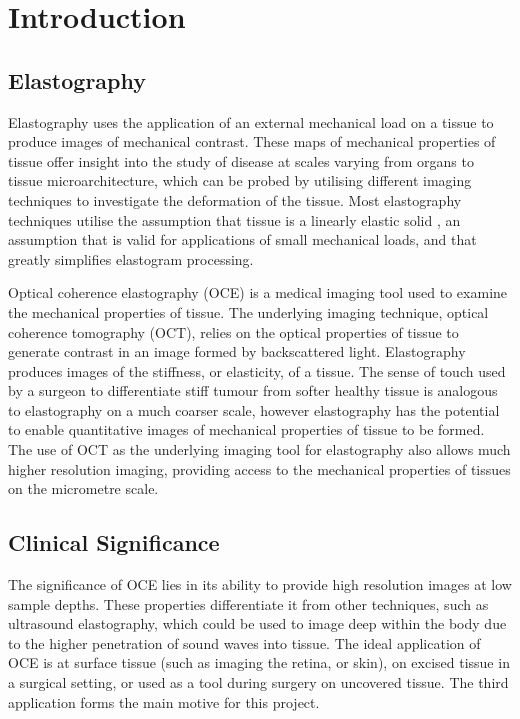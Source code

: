 \chapter{Introduction}

\section{Elastography}
Elastography uses the application of an external mechanical load on a tissue to produce images of mechanical contrast. These maps of mechanical properties of tissue offer insight into the study of disease at scales varying from organs to tissue microarchitecture, which can be probed by utilising different imaging techniques to investigate the deformation of the tissue. Most elastography techniques utilise the assumption that tissue is a linearly elastic solid \cite{kennedy_review_2014}, an assumption that is valid for applications of small mechanical loads, and that greatly simplifies elastogram processing. 

Optical coherence elastography (OCE) is a medical imaging tool used to examine the mechanical properties of tissue. The underlying imaging technique, optical coherence tomography (OCT), relies on the optical properties of tissue to generate contrast in an image formed by backscattered light. Elastography produces images of the stiffness, or elasticity, of a tissue. The sense of touch used by a surgeon to differentiate stiff tumour from softer healthy tissue is analogous to elastography on a much coarser scale, however elastography has the potential to enable quantitative images of mechanical properties of tissue to be formed. The use of OCT as the underlying imaging tool for elastography also allows much higher resolution imaging, providing access to the mechanical properties of tissues on the micrometre scale. 

\section{Clinical Significance}
The significance of OCE lies in its ability to provide high resolution images at low sample depths. These properties differentiate it from other techniques, such as ultrasound elastography, which could be used to image deep within the body due to the higher penetration of sound waves into tissue. The ideal application of OCE is at surface tissue (such as imaging the retina, or skin), on excised tissue in a surgical setting, or used as a tool during surgery on uncovered tissue. The third application forms the main motive for this project.

